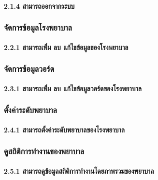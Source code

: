 \hspace{2.5cm}\paragraph{2.1.4 สามารถออกจากระบบ}

\hspace{1cm}\subsubsection{จัดการข้อมูลโรงพยาบาล}

\hspace{2.5cm}\paragraph{2.2.1 สามารถเพิ่ม ลบ แก้ไขข้อมูลของโรงพยาบาล}

\hspace{1cm}\subsubsection{จัดการข้อมูลวอร์ด}

\hspace{2.5cm}\paragraph{2.3.1 สามารถเพิ่ม ลบ แก้ไขข้อมูลวอร์ดของโรงพยาบาล}

\hspace{1cm}\subsubsection{ตั้งค่าระดับพยาบาล}

\hspace{2.5cm}\paragraph{2.4.1 สามารถตั้งค่าระดับพยาบาลของโรงพยาบาล}

\hspace{1cm}\subsubsection{ดูสถิติการทำงานของพยาบาล}

\hspace{2.5cm}\paragraph{2.5.1 สามารถดูข้อมูลสถิติการทำงานโดยภาพรวมของพยาบาล}





